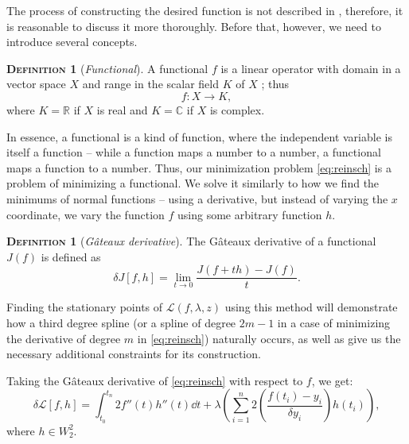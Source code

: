 \documentclass[11pt,leqno]{book}
\theoremstyle{definition}
\theoremstyle{plain}
\theoremstyle{definition}
\newtheorem{definition}[theorem]{\scshape{Definition}}
\begin{document}
{The process of constructing the desired function is not described in \cite{REINSCH1967}, therefore, it is reasonable to discuss it more thoroughly. Before that, however, we need to introduce several concepts.
\begin{definition}[\textit{Functional}]
A functional $f$ is a linear operator with domain in a vector space $X$ and range in the scalar field $K$ of $X$ \cite{kreyszig1978introductory}; thus
\[
f: X \to K,
\]
where $K = \mathbb{R}$ if $X$ is real and $K = \mathbb{C}$ if $X$ is complex. 
\end{definition} 
\noindent In essence, a functional is a kind of function, where the independent variable is itself a function -- while a function maps a number to a number, a functional maps a function to a number. Thus, our minimization problem \eqref{eq:reinsch} is a problem of minimizing a functional. We solve it similarly to how we find the minimums of normal functions -- using a derivative, but instead of varying the $x$ coordinate, we vary the function $f$ using some arbitrary function $h$. 
\begin{definition}[\textit{G\^{a}teaux derivative}]
The {G\^{a}teaux derivative} of a functional $J(f)$ is defined as
\begin{equation*}
    \delta J[f,h] =\lim_{t\to0} \frac{J(f+th)-J(f)}{t}.
\end{equation*}
\end{definition}
\noindent Finding the stationary points of $\mathcal{L}(f, \lambda, z)$ using this method will demonstrate how a third degree spline (or a spline of degree $2m-1$ in a case of minimizing the derivative of degree $m$ in \eqref{eq:reinsch}) naturally occurs, as well as give us the necessary additional constraints for its construction.

Taking the G\^{a}teaux derivative of \eqref{eq:reinsch} with respect to $f$, we get:
\begin{equation*}
     \delta\mathcal{L}[f,h]=\int_{t_0}^{t_n}2{f''(t)h''(t)\dd t} + \lambda \left(\sum_{i=1}^{n}2(\frac{f(t_i) - {y}_i}{{\delta}{y}_i})h(t_i) \right),
\label{eq:reinsch2}
\end{equation*}
where $h\in W^2_2$.

}
\end{document}
